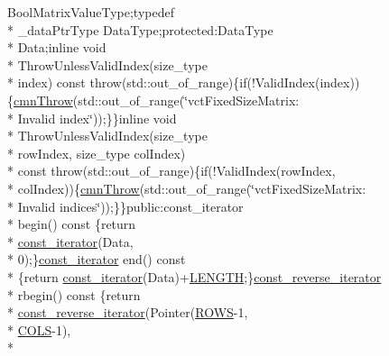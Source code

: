 \begin{DoxyCompactItemize}
 Bool\-Matrix\-Value\-Type;typedef \\*
\-\_\-data\-Ptr\-Type Data\-Type;protected\-:\-Data\-Type \\*
Data;inline void \\*
Throw\-Unless\-Valid\-Index(size\-\_\-type \\*
index) const throw(std\-::out\-\_\-of\-\_\-range)\{if(!Valid\-Index(index))\{\hyperlink{cmn_throw_8h_a6fe29a0b6f112fe0032896bb904f8377}{cmn\-Throw}(std\-::out\-\_\-of\-\_\-range(\char`\"{}vct\-Fixed\-Size\-Matrix\-: \\*
Invalid index\char`\"{}));\}\}inline void \\*
Throw\-Unless\-Valid\-Index(size\-\_\-type \\*
row\-Index, size\-\_\-type col\-Index) \\*
const throw(std\-::out\-\_\-of\-\_\-range)\{if(!Valid\-Index(row\-Index, \\*
col\-Index))\{\hyperlink{cmn_throw_8h_a6fe29a0b6f112fe0032896bb904f8377}{cmn\-Throw}(std\-::out\-\_\-of\-\_\-range(\char`\"{}vct\-Fixed\-Size\-Matrix\-: \\*
Invalid indices\char`\"{}));\}\}public\-:const\-\_\-iterator \\*
begin() const \{return \\*
\hyperlink{classvct_fixed_size_const_matrix_base_a896eacc5ccf7915b3e109bf9dbded884}{const\-\_\-iterator}(Data, \\*
0);\}\hyperlink{classvct_fixed_size_const_matrix_base_a896eacc5ccf7915b3e109bf9dbded884}{const\-\_\-iterator} end() const \\*
\{return \hyperlink{classvct_fixed_size_const_matrix_base_a896eacc5ccf7915b3e109bf9dbded884}{const\-\_\-iterator}(Data)+\hyperlink{classvct_fixed_size_const_matrix_base_a05da4a844e1880e31d3052abb9a8063ba3a9b8b3d119455a4b5f4a6553a707f92}{L\-E\-N\-G\-T\-H};\}\hyperlink{classvct_fixed_size_const_matrix_base_a86918b3da51e15dce72b62abdc6378fa}{const\-\_\-reverse\-\_\-iterator} \\*
rbegin() const \{return \\*
\hyperlink{classvct_fixed_size_const_matrix_base_a86918b3da51e15dce72b62abdc6378fa}{const\-\_\-reverse\-\_\-iterator}(Pointer(\hyperlink{classvct_fixed_size_const_matrix_base_a05da4a844e1880e31d3052abb9a8063ba628eeb65016492a84b40dad539262735}{R\-O\-W\-S}-\/1, \\*
\hyperlink{classvct_fixed_size_const_matrix_base_a05da4a844e1880e31d3052abb9a8063ba99583531bd0415ad92eed81fc931d592}{C\-O\-L\-S}-\/1), \\*

\end{DoxyCompactItemize}
